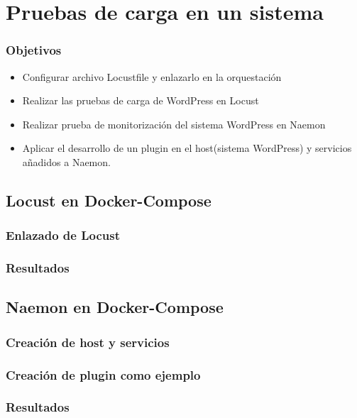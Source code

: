 \documentclass{beamer}
\theoremstyle{plain}
\theoremstyle{definition}
\theoremstyle{plain}
\theoremstyle{definition}
\theoremstyle{remark}
\theoremstyle{definition}
\begin{document}
\section{Pruebas de carga en un sistema} %
\begin{frame}
	
	\frametitle{Objetivos}
	\begin{itemize}
		
		\item Configurar archivo Locustfile y enlazarlo en la orquestación
		\item Realizar las pruebas de carga de WordPress en Locust
		\item Realizar prueba de monitorización del sistema WordPress en Naemon
		\item Aplicar el desarrollo de un plugin en el host(sistema WordPress) y servicios añadidos a Naemon.		
	\end{itemize}
	
\end{frame}

\subsection{Locust en Docker-Compose}
\begin{frame}
	\frametitle{Enlazado de Locust}
	
\end{frame}
\begin{frame}
	\frametitle{Resultados}
	\end{frame}
\subsection{Naemon en Docker-Compose}
\begin{frame}
	\frametitle{Creación de host y servicios}
	
\end{frame}
\begin{frame}
	\frametitle{Creación de plugin como ejemplo}
	
\end{frame}
\begin{frame}
	\frametitle{Resultados}
	\end{frame}
\end{document}
